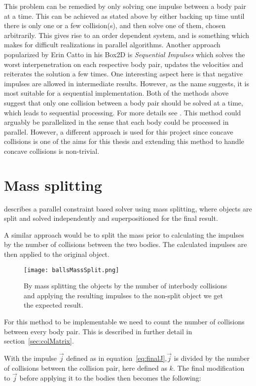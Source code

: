 This problem can be remedied by only solving one impulse between a body pair at a time.
This can be achieved as stated above by either backing up time until there
is only one or a few collision(s), and then solve one of them, chosen
arbitrarily. This gives rise to an order dependent system, and is something which
makes for difficult realizations in parallel algorithms. Another approach popularized
by Erin Catto in his Box2D is \textit{Sequential Impulses} which solves the worst interpenetration
on each respective body pair, updates the velocities and reiterates the solution a few times.
One interesting aspect here is that negative impulses are allowed in intermediate
results. However, as the name suggests, it is most suitable for a sequential implementation.
Both of the methods above suggest that only one collision between a body pair should
be solved at a time, which leads to sequential processing. For more details see \cite{catto}.
This method could arguably be parallelized in the sense that each body could be
processed in parallel. However, a different approach is used for this project since
concave collisions is one of the aims for this thesis and extending this method to
handle concave collisions is non-trivial.

\section{Mass splitting}\label{sec:massSplit}
\cite{tonge} describes a parallel constraint based solver
using mass splitting, where objects are split and solved independently and superpositioned
for the final result.

A similar approach would be to split the mass prior to
calculating the impulses by the number of collisions between the two bodies. The
calculated impulses are then applied to the original object.

\begin{figure}[H]
  \centering
  \texttt{[image: ballsMassSplit.png]}
  \caption{By mass splitting the objects by the number of interbody collisions
  and applying the resulting impulses to the non-split object we get the expected result.}
  \label{fig:massSplit}
\end{figure}

For this method to be implementable we need to count the number of collisions between
every body pair. This is described in further detail in section~\ref{sec:colMatrix}.

With the impulse $\vec{j}$ defined as in equation~\ref{eq:finalJ},$\vec{j}$ is divided by
the number of collisions between the collision pair, here defined as $k$. The final modification to
$\vec{j}$ before applying it to the bodies then becomes the following:

